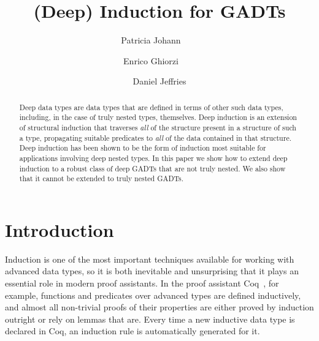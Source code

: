 \documentclass[9pt]{entcs}
\begin{document}
\begin{frontmatter}
  \vspace*{-0.1in}
  \title{(Deep) Induction for GADTs\vspace*{-0.1in}}
  \author{Patricia Johann~~~~}%
  \author{Enrico Ghiorzi~~~~}%
  \author{Daniel Jeffries}%
  \address{$\mathtt{\{johannp,ghiorzie,jeffriesd\}@appstate.edu}$\\
    Appalachian State University}

\vspace*{-0.1in}

  \begin{abstract} 
Deep data types are data types that are defined in terms of other such
data types, including, in the case of truly nested types, themselves.
Deep induction is an extension of structural induction that traverses
{\em all} of the structure present in a structure of such a type,
propagating suitable predicates to {\em all} of the data contained in
that structure. Deep induction has been shown to be the form of
induction most suitable for applications involving deep nested
types. In this paper we show how to extend deep induction to a robust
class of deep GADTs that are not truly nested. We also show that it
cannot be extended to truly nested GADTs.
\end{abstract}


\end{frontmatter}

\vspace*{-0.1in}

\section{Introduction}\label{sec:intro}


Induction is one of the most important techniques available for
working with advanced data types, so it is both inevitable and
unsurprising that it plays an essential role in modern proof
assistants. In the proof assistant Coq~\cite{coq20}, for example,
functions and predicates over advanced types are defined inductively,
and almost all non-trivial proofs of their properties are either
proved by induction outright or rely on lemmas that are. Every time a
new inductive data type is declared in Coq, an induction rule is
automatically generated for it.
\end{document}
